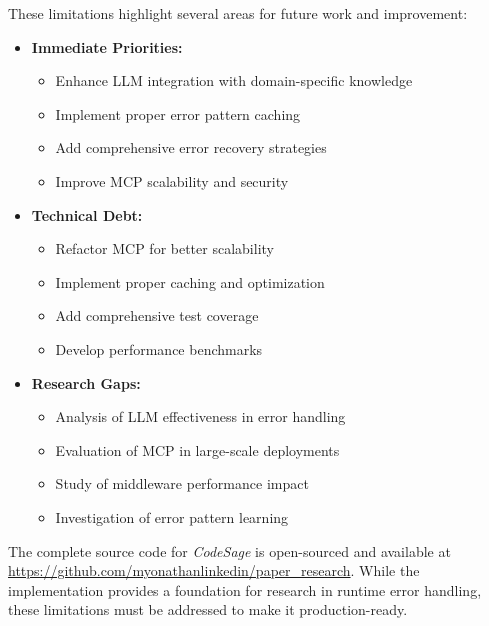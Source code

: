 These limitations highlight several areas for future work and improvement:

\begin{itemize}
    \item \textbf{Immediate Priorities:}
    \begin{itemize}
        \item Enhance LLM integration with domain-specific knowledge
        \item Implement proper error pattern caching
        \item Add comprehensive error recovery strategies
        \item Improve MCP scalability and security
    \end{itemize}

    \item \textbf{Technical Debt:}
    \begin{itemize}
        \item Refactor MCP for better scalability
        \item Implement proper caching and optimization
        \item Add comprehensive test coverage
        \item Develop performance benchmarks
    \end{itemize}

    \item \textbf{Research Gaps:}
    \begin{itemize}
        \item Analysis of LLM effectiveness in error handling
        \item Evaluation of MCP in large-scale deployments
        \item Study of middleware performance impact
        \item Investigation of error pattern learning
    \end{itemize}
\end{itemize}

The complete source code for \textit{CodeSage} is open-sourced and available at \url{https://github.com/myonathanlinkedin/paper_research}. While the implementation provides a foundation for research in runtime error handling, these limitations must be addressed to make it production-ready. 